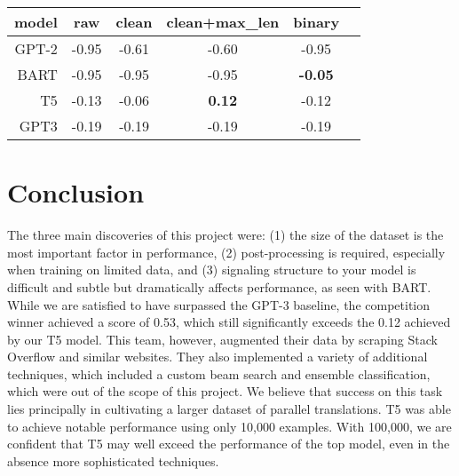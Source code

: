 \documentclass{article}
\begin{document}
\begin{center}
	\begin{tabular}{rccccc}
		\toprule
    model & raw   & clean & clean+max\_len & binary\\
		\midrule
    GPT-2 & -0.95 & -0.61 & -0.60 & -0.95          \\
    BART  & -0.95 & -0.95 & -0.95 & \textbf{-0.05}         \\
    T5    & -0.13 & -0.06 & \textbf{0.12} & -0.12   \\
		\hline
    GPT3  & -0.19 & -0.19 & -0.19 & -0.19         \\
		\bottomrule
	\end{tabular}
\end{center}



\section{Conclusion}
The three main discoveries of this project were: (1) the size of the dataset is
the most important factor in performance, (2) post-processing is required,
especially when training on limited data, and (3) signaling structure to your
model is difficult and subtle but dramatically affects performance, as seen
with BART. While we are satisfied to have surpassed the GPT-3 baseline, the
competition winner achieved a score of 0.53, which still significantly exceeds
the 0.12 achieved by our T5 model. This team, however, augmented their data by
scraping Stack Overflow and similar websites. They also implemented a variety of
additional techniques, which included a custom beam search and ensemble
classification, which were out of the scope of this project. We believe that
success on this task lies principally in cultivating a larger dataset of
parallel translations. T5 was able to achieve notable performance using only
10,000 examples. With 100,000, we are confident that T5 may well exceed the
performance of the top model, even in the absence more sophisticated
techniques.




\end{document}
